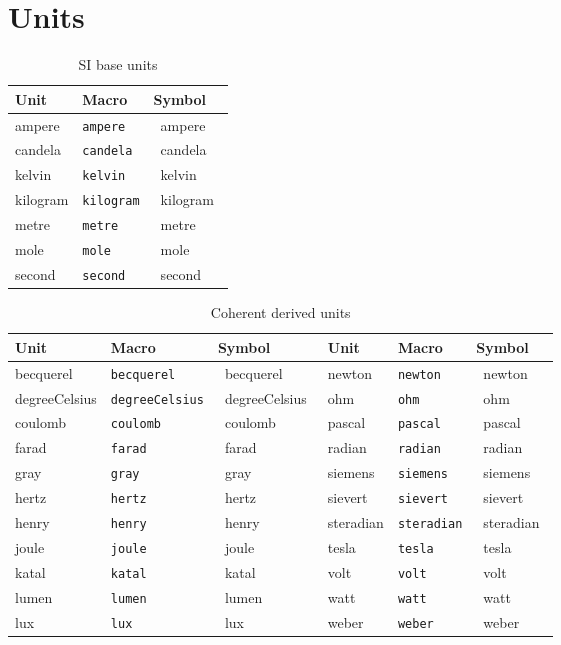 \documentclass{article}
\def\Backslash{\copy\slashbox}
\begin{document}
\section{Units}
\def\showunit#1{#1 & \texttt{\Backslash#1} & \si{\csname#1\endcsname}}
\begin{table}
\caption{SI base units}
\centering
\begin{tabular}{lll}\hline\hline
Unit & Macro & Symbol \\\hline
\showunit{ampere}\\
\showunit{candela}\\
\showunit{kelvin}\\
\showunit{kilogram}\\
\showunit{metre}\\
\showunit{mole}\\
\showunit{second}\\
\end{tabular}
\end{table}

\begin{table}
\caption{Coherent derived units}
\centering
\begin{tabular}{llllll}\hline\hline
Unit & Macro & Symbol &
Unit & Macro & Symbol \\\hline
\showunit{becquerel}     & \showunit{newton} \\
\showunit{degreeCelsius} & \showunit{ohm} \\
\showunit{coulomb}       & \showunit{pascal} \\
\showunit{farad}         & \showunit{radian} \\
\showunit{gray}          & \showunit{siemens} \\
\showunit{hertz}         & \showunit{sievert} \\
\showunit{henry}         & \showunit{steradian} \\
\showunit{joule}         & \showunit{tesla} \\
\showunit{katal}         & \showunit{volt} \\
\showunit{lumen}         & \showunit{watt} \\
\showunit{lux}           & \showunit{weber} \\
\end{tabular}
\end{table}
\end{document}

